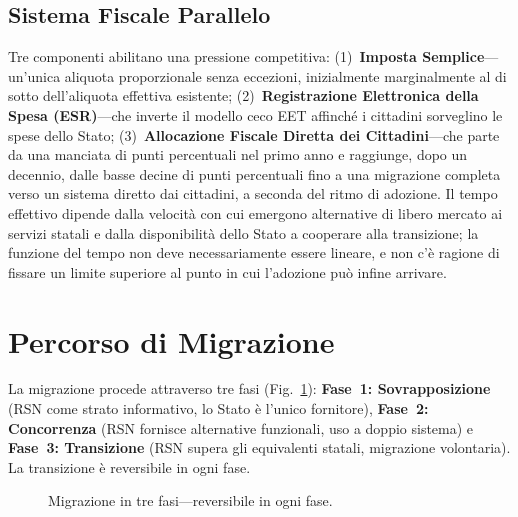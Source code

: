 \documentclass[11pt,a4paper,twocolumn]{article}
\begin{document}
\subsection{Sistema Fiscale Parallelo}

Tre componenti abilitano una pressione competitiva: (1)~\textbf{Imposta Semplice}---un'unica aliquota proporzionale senza eccezioni, inizialmente marginalmente al di sotto dell'aliquota effettiva esistente; (2)~\textbf{Registrazione Elettronica della Spesa (ESR)}---che inverte il modello ceco EET affinché i cittadini sorveglino le spese dello Stato; (3)~\textbf{Allocazione Fiscale Diretta dei Cittadini}---che parte da una manciata di punti percentuali nel primo anno e raggiunge, dopo un decennio, dalle basse decine di punti percentuali fino a una migrazione completa verso un sistema diretto dai cittadini, a seconda del ritmo di adozione. Il tempo effettivo dipende dalla velocità con cui emergono alternative di libero mercato ai servizi statali e dalla disponibilità dello Stato a cooperare alla transizione; la funzione del tempo non deve necessariamente essere lineare, e non c'è ragione di fissare un limite superiore al punto in cui l'adozione può infine arrivare.

\section{Percorso di Migrazione}

La migrazione procede attraverso tre fasi (Fig.~\ref{fig:migration}): \textbf{Fase~1: Sovrapposizione} (RSN come strato informativo, lo Stato è l'unico fornitore), \textbf{Fase~2: Concorrenza} (RSN fornisce alternative funzionali, uso a doppio sistema) e \textbf{Fase~3: Transizione} (RSN supera gli equivalenti statali, migrazione volontaria). La transizione è reversibile in ogni fase.

\begin{figure}[ht]
\centering
{}
\caption{Migrazione in tre fasi---reversibile in ogni fase.}
\label{fig:migration}
\end{figure}
\end{document}
